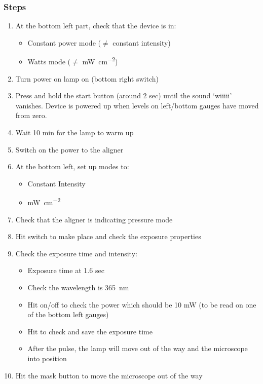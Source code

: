 \documentclass[12pt,a4paper]{report}
\begin{document}
\subsubsection{Steps}
\begin{enumerate}
\item At the bottom left part, check that the device is in:
\begin{itemize}[nolistsep, noitemsep]
\item Constant power mode ($\neq$ constant intensity)
\item Watts mode ($\neq$ \si{\milli\watt\per\square\centi\meter})
\end{itemize}
\item Turn power on lamp on (bottom right switch)
\item Press and hold the start button (around 2 sec) until the sound `wiiiii' vanishes.
Device is powered up when levels on left/bottom gauges have moved from zero.
\item Wait 10 min for the lamp to warm up
\item Switch on the power to the aligner
\item At the bottom left, set up modes to:
\begin{itemize}[nolistsep, noitemsep]
  \item Constant Intensity
  \item \si{\milli\watt\per\square\centi\meter}
\end{itemize}
\item Check that the aligner is indicating pressure mode
\item Hit  switch to make place and check the exposure properties
\item Check the exposure time and intensity:
\begin{itemize}[nolistsep, noitemsep]
  \item Exposure time at 1.6 sec
  \item Check the wavelength is \SI{365}{\nano\meter}
  \item Hit  on/off to check the power which should be 10 mW (to be read on one of the bottom left gauges)
  \item Hit  to check and save the exposure time
  \item After the pulse, the lamp will move out of the way and the microscope into position
\end{itemize}
\item Hit the mask  button to move the microscope out of the way

\end{enumerate}
\end{document}
